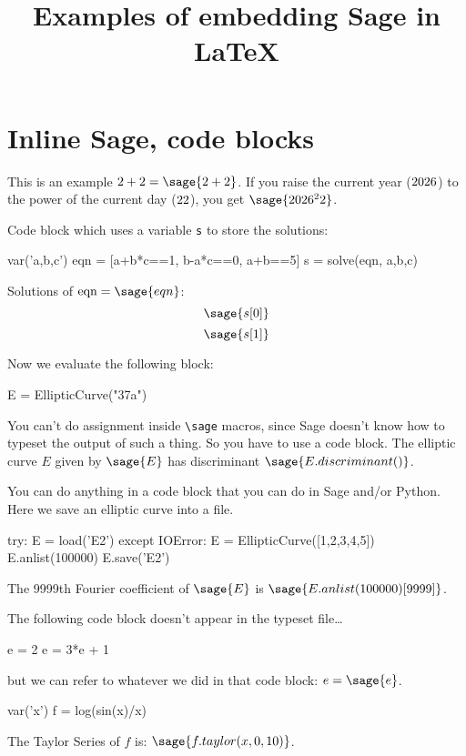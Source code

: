 \documentclass{article}
\title{Examples of embedding Sage in \LaTeX}
\author{\relax}
\begin{document}
\maketitle

\section{Inline Sage, code blocks}

This is an example $2+2=\sage{2+2}$. If you raise the current year
($\the\year$) to the power of the current day ($\the\day$), you get
$\sage{\the\year^\the\day}$.

Code block which uses a variable \texttt{s} to store the solutions:
\begin{sageblock}
 var('a,b,c')
 eqn = [a+b*c==1, b-a*c==0, a+b==5]
 s = solve(eqn, a,b,c)
\end{sageblock}

Solutions of $\mbox{eqn}=\sage{eqn}$:
$$
\sage{s[0]}
$$
$$
\sage{s[1]}
$$

Now we evaluate the following block:
\begin{sageblock}
E = EllipticCurve("37a")
\end{sageblock}
You can't do assignment inside \verb|\sage| macros, since Sage doesn't
know how to typeset the output of such a thing. So you have to use a
code block. The elliptic curve $E$ given by $\sage{E}$ 
has discriminant $\sage{E.discriminant()}$. 

You can do anything in a code block that you can do in Sage and/or
Python. Here we save an elliptic curve into a file.
\begin{sageblock}
try:
    E = load('E2')
except IOError:
    E = EllipticCurve([1,2,3,4,5])
    E.anlist(100000)
    E.save('E2')
\end{sageblock}
\label{ellipticcurve}

The 9999th Fourier coefficient of $\sage{E}$ is 
$\sage{E.anlist(100000)[9999]}$. 

The following code block doesn't appear in the typeset file\dots
\begin{sagesilent}
  e = 2
  e = 3*e + 1
\end{sagesilent}
but we can refer to whatever we did in that code block: $e=\sage{e}$.

\begin{sageblock}
  var('x')
  f = log(sin(x)/x)
\end{sageblock}
The Taylor Series of $f$ is: $\sage{ f.taylor(x, 0, 10) }$.
\end{document}
